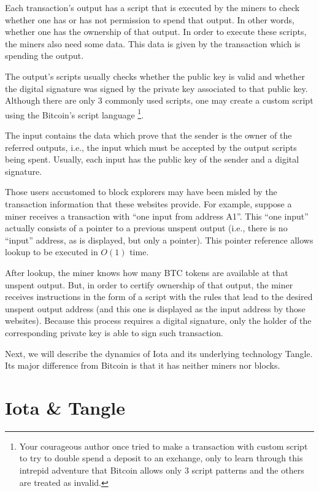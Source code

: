 Each transaction's output has a script that is executed by the miners to check whether one has or has not permission to spend that output. In other words, whether one has the ownership of that output. In order to execute these scripts, the miners also need some data. This data is given by the transaction which is spending the output.

The output's scripts usually checks whether the public key is valid and whether the digital signature was signed by the private key associated to that public key. Although there are only 3 commonly used scripts, one may create a custom script using the Bitcoin's script language \footnote{Your courageous author once tried to make a transaction with custom script to try to double spend a deposit to an exchange, only to learn through this intrepid adventure that Bitcoin allows only 3 script patterns and the others are treated as invalid.}.

The input contains the data which prove that the sender is the owner of the referred outputs, i.e., the input which must be accepted by the output scripts being spent. Usually, each input has the public key of the sender and a digital signature.

Those users accustomed to block explorers may have been misled by the transaction information that these websites provide.  For example, suppose a miner receives a transaction with ``one input from address A1''.  This ``one input'' actually consists of a pointer to a previous unspent output (i.e., there is no ``input'' address, as is displayed, but only a pointer). This pointer reference allows lookup to be executed in $O(1)$ time.

After lookup, the miner knows how many BTC tokens are available at that unspent output.  But, in order to certify ownership of that output, the miner receives instructions in the form of a script with the rules that lead to the desired unspent output address (and this one is displayed as the input address by those websites). Because this process requires a digital signature, only the holder of the corresponding private key is able to sign such transaction.

Next, we will describe the dynamics of Iota and its underlying technology Tangle. Its major difference from Bitcoin is that it has neither miners nor blocks.


\chapter{Iota \& Tangle}

